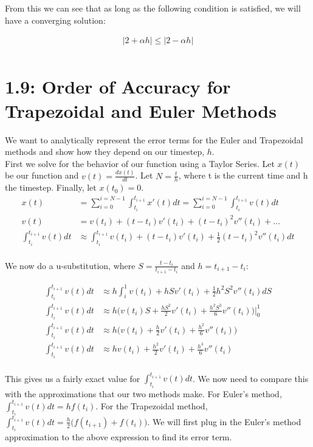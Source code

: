 \documentclass[10pt]{article} %
\begin{document}
From this we can see that as long as the following condition is satisfied, we will have a converging solution:

\begin{align}
  |2 + \alpha h| \leq |2 - \alpha h|\\
\end{align}
\section{1.9: Order of Accuracy for Trapezoidal and Euler Methods}
We want to analytically represent the error terms for the Euler and Trapezoidal methods and show how they depend on our timestep, $h$.\\

First we solve for the behavior of our function using a Taylor Series. Let $x(t)$ be our function and $v(t) = \frac{dx(t)}{dt}$. Let $N = \frac{t}{h}$, where t is the current time and h the timestep. Finally, let $x(t_0) = 0$.\\

\begin{align}
  x(t) &= \sum_{i=0}^{i=N-1} \int_{t_i}^{t_{i+1}} x'(t)dt = \sum_{i=0}^{i=N-1} \int_{t_i}^{t_{i+1}} v(t)dt\\
  v(t) &= v(t_i) + (t-t_i)v'(t_i) + (t-t_i)^2v''(t_i) + ...\\
  \int_{t_i}^{t_{i+1}} v(t)dt &\approx \int_{t_i}^{t_{i+1}} v(t_i) + (t-t_i)v'(t_i) + \frac{1}{2}(t-t_i)^2v''(t_i)  dt\\
\end{align}

We now do a u-substitution, where $S = \frac{t - t_i}{t_{i+1} - t_i}$ and $h = t_{i+1} - t_i$:

\begin{align}
  \int_{t_i}^{t_{i+1}} v(t)dt &\approx h\int_i^1 v(t_i) + hSv'(t_i) + \frac{1}{2}h^2S^2v''(t_i) dS\\
  \int_{t_i}^{t_{i+1}} v(t)dt &\approx h \big( v(t_i)S + \frac{hS^2}{2}v'(t_i) + \frac{h^2S^3}{6}v''(t_i) \big) |_0^1 \\
  \int_{t_i}^{t_{i+1}} v(t)dt &\approx h \big( v(t_i) + \frac{h}{2}v'(t_i) + \frac{h^2}{6}v''(t_i) \big) \\
  \int_{t_i}^{t_{i+1}} v(t)dt &\approx hv(t_i) + \frac{h^2}{2}v'(t_i) + \frac{h^3}{6}v''(t_i) \\
\end{align}

This gives us a fairly exact value for $\int_{t_i}^{t_{i+1}} v(t)dt$. We now need to compare this with the approximations that our two methods make. For Euler's method, $\int_{t_i}^{t_{i+1}} v(t)dt = hf(t_i)$. For the Trapezoidal method, $\int_{t_i}^{t_{i+1}} v(t)dt = \frac{h}{2}\Big( f(t_{i+1}) + f(t_{i}) \Big)$. We will first plug in the Euler's method approximation to the above expression to find its error term.
\end{document}
